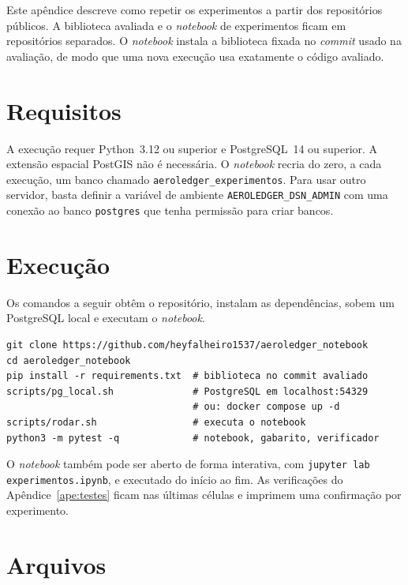 Este apêndice descreve como repetir os experimentos a partir dos repositórios públicos. A biblioteca avaliada \cite{aeroledger} e o \textit{notebook} de experimentos \cite{aeroledger_experimentos} ficam em repositórios separados. O \textit{notebook} instala a biblioteca fixada no \textit{commit} usado na avaliação, de modo que uma nova execução usa exatamente o código avaliado.

\section{Requisitos}

A execução requer Python~3.12 ou superior e PostgreSQL~14 ou superior. A extensão espacial PostGIS não é necessária. O \textit{notebook} recria do zero, a cada execução, um banco chamado \texttt{aeroledger\_experimentos}. Para usar outro servidor, basta definir a variável de ambiente \texttt{AEROLEDGER\_DSN\_ADMIN} com uma conexão ao banco \texttt{postgres} que tenha permissão para criar bancos.

\section{Execução}

Os comandos a seguir obtêm o repositório, instalam as dependências, sobem um PostgreSQL local e executam o \textit{notebook}.

\begin{verbatim}
git clone https://github.com/heyfalheiro1537/aeroledger_notebook
cd aeroledger_notebook
pip install -r requirements.txt  # biblioteca no commit avaliado
scripts/pg_local.sh              # PostgreSQL em localhost:54329
                                 # ou: docker compose up -d
scripts/rodar.sh                 # executa o notebook
python3 -m pytest -q             # notebook, gabarito, verificador
\end{verbatim}

O \textit{notebook} também pode ser aberto de forma interativa, com \texttt{jupyter lab experimentos.ipynb}, e executado do início ao fim. As verificações do Apêndice~\ref{ape:testes} ficam nas últimas células e imprimem uma confirmação por experimento.

\section{Arquivos}

